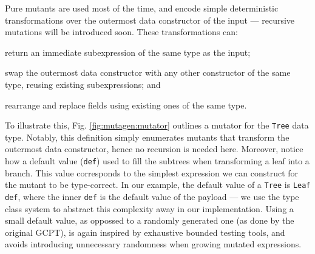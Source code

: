 \documentclass[sigconf, anonymous, review]{acmart}
\newcommand{\mutagen}{\textsc{Mutagen}\xspace}
\begin{document}
Pure mutants are used most of the time, and encode simple deterministic
transformations over the outermost data constructor of the input --- recursive
mutations will be introduced soon.
%
These transformations can:
%
\begin{inparaenum}
\item return an immediate subexpression of the same type as the input;
\item swap the outermost data constructor with any other constructor of the
  same type, reusing existing subexpressions; and
\item rearrange and replace fields using existing ones of the same type.
\end{inparaenum}
%
To illustrate this, Fig. \ref{fig:mutagen:mutator} outlines a mutator for the
\texttt{Tree} data type.
%
Notably, this definition simply enumerates mutants that transform the outermost
data constructor, hence no recursion is needed here.
%
Moreover, notice how a default value (\texttt{def}) used to fill the subtrees
when transforming a leaf into a branch.
%
This value corresponds to the simplest expression we can construct for the
mutant to be type-correct.
%
In our example, the default value of a \texttt{Tree} is \texttt{Leaf def}, where
the inner \texttt{def} is the default value of the payload --- we use the type
class system to abstract this complexity away in our implementation.
%
Using a small default value, as oppossed to a randomly generated one (as done by
the original GCPT), is again inspired by exhaustive bounded testing tools, and
avoids introducing unnecessary randomness when growing mutated expressions.

\end{document}
